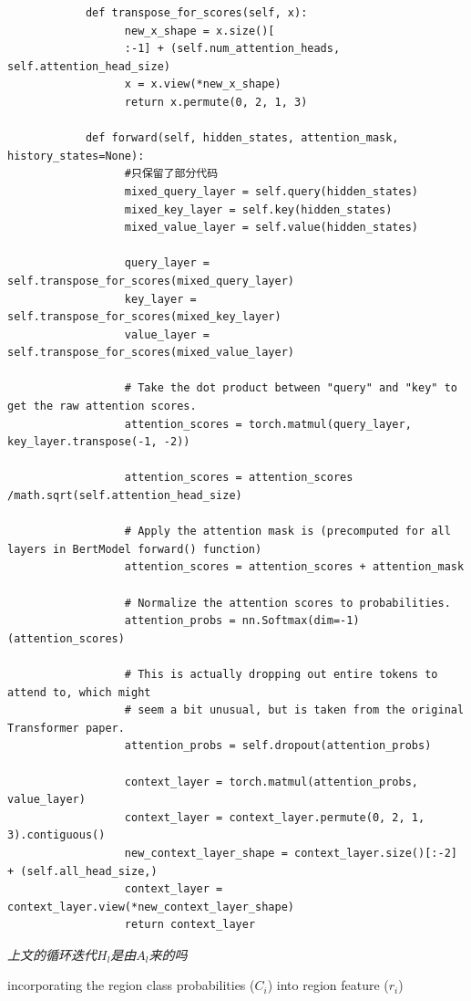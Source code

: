 \documentclass{article}
\begin{document}
\begin{sloppypar}
\begin{lstlisting}
            def transpose_for_scores(self, x):
                  new_x_shape = x.size()[
                  :-1] + (self.num_attention_heads, self.attention_head_size)
                  x = x.view(*new_x_shape)
                  return x.permute(0, 2, 1, 3)

            def forward(self, hidden_states, attention_mask, history_states=None):
                  #只保留了部分代码
                  mixed_query_layer = self.query(hidden_states)
                  mixed_key_layer = self.key(hidden_states)
                  mixed_value_layer = self.value(hidden_states)

                  query_layer = self.transpose_for_scores(mixed_query_layer)
                  key_layer = self.transpose_for_scores(mixed_key_layer)
                  value_layer = self.transpose_for_scores(mixed_value_layer)

                  # Take the dot product between "query" and "key" to get the raw attention scores.
                  attention_scores = torch.matmul(query_layer, key_layer.transpose(-1, -2))

                  attention_scores = attention_scores /math.sqrt(self.attention_head_size)

                  # Apply the attention mask is (precomputed for all layers in BertModel forward() function)
                  attention_scores = attention_scores + attention_mask

                  # Normalize the attention scores to probabilities.
                  attention_probs = nn.Softmax(dim=-1)(attention_scores)

                  # This is actually dropping out entire tokens to attend to, which might
                  # seem a bit unusual, but is taken from the original Transformer paper.
                  attention_probs = self.dropout(attention_probs)

                  context_layer = torch.matmul(attention_probs, value_layer)
                  context_layer = context_layer.permute(0, 2, 1, 3).contiguous()
                  new_context_layer_shape = context_layer.size()[:-2] + (self.all_head_size,)
                  context_layer = context_layer.view(*new_context_layer_shape)
                  return context_layer
      \end{lstlisting}

      \textit{上文的循环迭代$H_l$是由$A_l$来的吗}

      incorporating the region class probabilities ($C_i$) into region feature ($r_i$)


\end{sloppypar}
\end{document}
